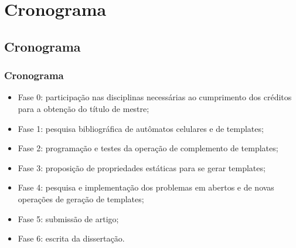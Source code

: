 \documentclass[aspectratio=43,hyperref={pdfpagelabels=false}]{beamer}
\begin{document}
 \section{Cronograma}
 \subsection*{Cronograma}

 \begin{frame}
     \frametitle{Cronograma}
      \begin{itemize}
          \item Fase 0: participação nas disciplinas necessárias ao cumprimento dos créditos para a obtenção do título de mestre;
          \item Fase 1: pesquisa bibliográfica de autômatos celulares e de templates;
          \item Fase 2: programação e testes da operação de complemento de templates;
          \item Fase 3: proposição de propriedades estáticas para se gerar templates;
          \item Fase 4: pesquisa e implementação dos problemas em abertos e de novas operações de geração de templates;
          \item Fase 5: submissão de artigo;
          \item Fase 6: escrita da dissertação.
      \end{itemize}
 \end{frame}
\end{document}
